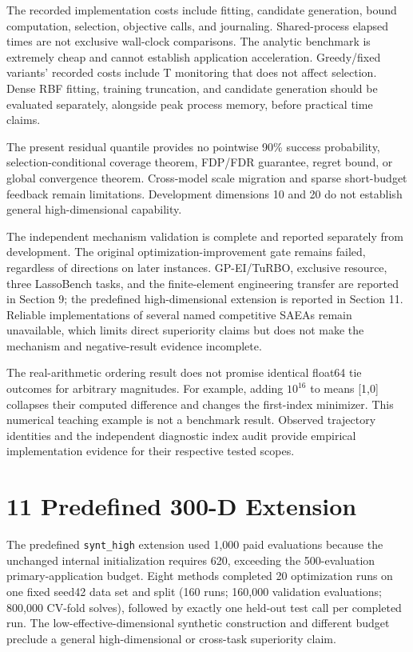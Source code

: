 \documentclass[11pt,a4paper]{article}
\begin{document}
The recorded implementation costs include fitting, candidate generation,
bound computation, selection, objective calls, and journaling.
Shared-process elapsed times are not exclusive wall-clock comparisons.
The analytic benchmark is extremely cheap and cannot establish
application acceleration. Greedy/fixed variants' recorded costs include
T monitoring that does not affect selection. Dense RBF fitting, training
truncation, and candidate generation should be evaluated separately,
alongside peak process memory, before practical time claims.

The present residual quantile provides no pointwise 90\% success
probability, selection-conditional coverage theorem, FDP/FDR guarantee,
regret bound, or global convergence theorem. Cross-model scale migration
and sparse short-budget feedback remain limitations. Development
dimensions 10 and 20 do not establish general high-dimensional
capability.

The independent mechanism validation is complete and reported separately
from development. The original optimization-improvement gate remains
failed, regardless of directions on later instances. GP-EI/TuRBO,
exclusive resource, three LassoBench tasks, and the finite-element
engineering transfer are reported in Section 9; the predefined
high-dimensional extension is reported in Section 11. Reliable
implementations of several named competitive SAEAs remain unavailable,
which limits direct superiority claims but does not make the mechanism
and negative-result evidence incomplete.

The real-arithmetic ordering result does not promise identical float64
tie outcomes for arbitrary magnitudes. For example, adding \(10^{16}\)
to means {[}1,0{]} collapses their computed difference and changes the
first-index minimizer. This numerical teaching example is not a
benchmark result. Observed trajectory identities and the independent
diagnostic index audit provide empirical implementation evidence for
their respective tested scopes.

\hypertarget{predefined-300-d-extension}{%
\section{11 Predefined 300-D
Extension}\label{predefined-300-d-extension}}

The predefined \texttt{synt\_high} extension used 1,000 paid evaluations
because the unchanged internal initialization requires 620, exceeding
the 500-evaluation primary-application budget. Eight methods completed
20 optimization runs on one fixed seed42 data set and split (160 runs;
160,000 validation evaluations; 800,000 CV-fold solves), followed by
exactly one held-out test call per completed run. The
low-effective-dimensional synthetic construction and different budget
preclude a general high-dimensional or cross-task superiority claim.
\end{document}
